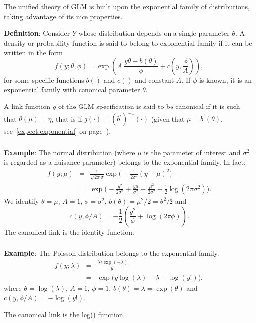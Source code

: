 \documentclass{beamer}
\newcommand{\bs}{\bigskip}
\begin{document}
\begin{frame}
\frametitle{}


The unified theory of GLM is built upon the {\color{blue}exponential family} of
distributions, taking advantage of its nice properties.

\bs

\textbf{Definition}: Consider $Y$ whose distribution depends on a single
parameter $\theta$. A density or probability function is said to
belong to {\color{blue}exponential family} if it can be written in the form
$$f(y; \theta,\phi) = \exp\left( A \ \frac{y \theta - b(\theta)}{\phi} +
c(y,\frac{\phi}{A}) \right),$$ 
for some specific functions $b()$ and $c()$ and constant $A$. If $\phi$ is
known, it is an exponential family with {\color{blue}canonical parameter} $\theta$.

\bs
A link function $g$ of the GLM specification is said to be canonical if it is
such that $\theta(\mu)=\eta$, that is if $g(\cdot) = (b^{\prime})^{-1}(\cdot)$
(given that $\mu=b^{\prime}(\theta)$, see~\eqref{expect.exponential} on
page~\pageref{expect.exponential}).   
\end{frame}


\begin{frame}
\frametitle{}

\textbf{Example}: The {\color{blue} normal distribution} (where $\mu$ is the
parameter of interest and $\sigma^2$ is regarded as a nuisance
parameter)  belongs to the exponential
family. In fact:
\begin{eqnarray*}
  f(y; \mu) & = & \frac{1}{\sqrt{2\pi}\sigma} \exp\big(-\frac{1}{2
  \sigma^2}(y-\mu)^2\big)\\
& = & \exp \big( -\frac{y^2}{2 \sigma^2} + \frac{y \mu}{\sigma^2} - \frac{\mu^2}{2 \sigma^2} - \frac{1}{2} \log(2 \pi \sigma^2) \big).
\end{eqnarray*}
We identify $\theta=\mu$, $A=1$, $\phi=\sigma^ 2$, $b(\theta) = \mu^2/2=
\theta^2/2$ and
$$c(y,\phi/A) = -\frac{1}{2} \left( \frac{y^2}{\phi} + \log(2 \pi \phi) \right).$$
The canonical link is the identity function.
\end{frame}

\begin{frame}
\frametitle{}

\textbf{Example}: The {\color{blue}Poisson distribution} belongs to the
exponential family.
\begin{eqnarray*}
  f(y;\lambda) & = & \frac{\lambda^y \exp(-\lambda)}{y!}\\
& = & \exp \big(y \log(\lambda) - \lambda - \log(y!) \big),
\end{eqnarray*}
where $\theta=\log(\lambda)$, $A=1$, $\phi=1$, $b(\theta) = \lambda = \exp(\theta)$
and $c(y,\phi/A)=-\log(y!)$.

\bs
The canonical link is the log() function.
\end{frame}
\end{document}
